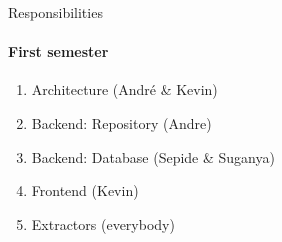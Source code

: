\begin{frame}{Responsibilities}
\framesubtitle{First semester}
	\begin{enumerate}
		\item Architecture (André \& Kevin)
		\item Backend: Repository (Andre)
		\item Backend: Database (Sepide \& Suganya)
		\item Frontend (Kevin)
		\item Extractors (everybody)
	\end{enumerate}
\end{frame}